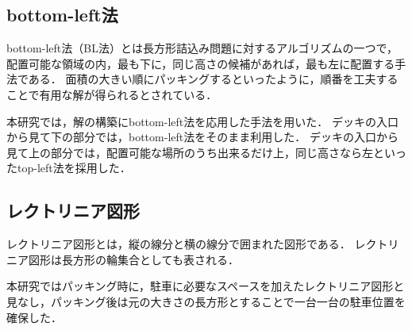 \subsection{bottom-left法}
bottom-left法（BL法）とは長方形詰込み問題に対するアルゴリズムの一つで，配置可能な領域の内，最も下に，同じ高さの候補があれば，最も左に配置する手法である．
面積の大きい順にパッキングするといったように，順番を工夫することで有用な解が得られるとされている．

本研究では，解の構築にbottom-left法を応用した手法を用いた．
デッキの入口から見て下の部分では，bottom-left法をそのまま利用した．
デッキの入口から見て上の部分では，配置可能な場所のうち出来るだけ上，同じ高さなら左といったtop-left法を採用した．



\subsection{レクトリニア図形}
レクトリニア図形とは，縦の線分と横の線分で囲まれた図形である．
レクトリニア図形は長方形の輪集合としても表される．

本研究ではパッキング時に，駐車に必要なスペースを加えたレクトリニア図形と見なし，パッキング後は元の大きさの長方形とすることで一台一台の駐車位置を確保した．
